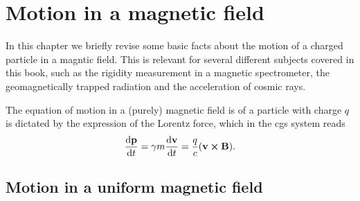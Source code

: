 \chapter{Motion in a magnetic field}\label{chap:bmotion}

In this chapter we briefly revise some basic facts about the motion of a charged
particle in a magntic field. This is relevant for several different subjects
covered in this book, such as the rigidity measurement in a magnetic spectrometer,
the geomagnetically trapped radiation and the acceleration of cosmic rays.

The equation of motion in a (purely) magnetic field is of a particle with charge
$q$ is dictated by the expression of the Lorentz force, which in the cgs system reads
\begin{align}
  \dv{\vb{p}}{t} = \gamma m \dv{\vb{v}}{t} = \frac{q}{c} (\vb{v} \cross \vb{B}).
\end{align}


\section{Motion in a uniform magnetic field}


